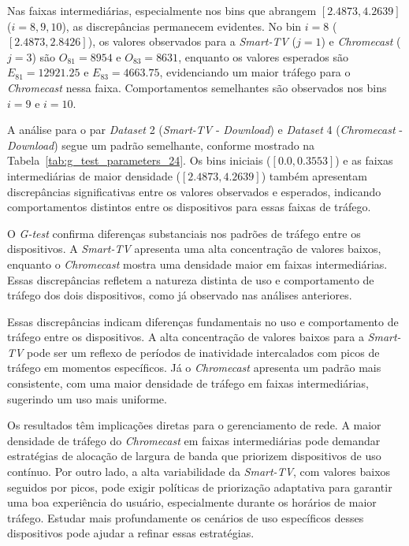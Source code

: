 Nas faixas intermediárias, especialmente nos bins que abrangem \([2.4873, 4.2639]\) (\(i = 8, 9, 10\)), as discrepâncias permanecem evidentes. No bin \(i=8\) (\([2.4873, 2.8426]\)), os valores observados para a \textit{Smart-TV} (\(j=1\)) e \textit{Chromecast} (\(j=3\)) são \(O_{81} = 8954\) e \(O_{83} = 8631\), enquanto os valores esperados são \(E_{81} = 12921.25\) e \(E_{83} = 4663.75\), evidenciando um maior tráfego para o \textit{Chromecast} nessa faixa. Comportamentos semelhantes são observados nos bins \(i=9\) e \(i=10\).

A análise para o par \textit{Dataset} 2 (\textit{Smart-TV} - \textit{Download}) e \textit{Dataset} 4 (\textit{Chromecast} - \textit{Download}) segue um padrão semelhante, conforme mostrado na Tabela~\ref{tab:g_test_parameters_24}. Os bins iniciais (\([0.0, 0.3553]\)) e as faixas intermediárias de maior densidade (\([2.4873, 4.2639]\)) também apresentam discrepâncias significativas entre os valores observados e esperados, indicando comportamentos distintos entre os dispositivos para essas faixas de tráfego.

O \textit{G-test} confirma diferenças substanciais nos padrões de tráfego entre os dispositivos. A \textit{Smart-TV} apresenta uma alta concentração de valores baixos, enquanto o \textit{Chromecast} mostra uma densidade maior em faixas intermediárias. Essas discrepâncias refletem a natureza distinta de uso e comportamento de tráfego dos dois dispositivos, como já observado nas análises anteriores.

Essas discrepâncias indicam diferenças fundamentais no uso e comportamento de tráfego entre os dispositivos. A alta concentração de valores baixos para a \textit{Smart-TV} pode ser um reflexo de períodos de inatividade intercalados com picos de tráfego em momentos específicos. Já o \textit{Chromecast} apresenta um padrão mais consistente, com uma maior densidade de tráfego em faixas intermediárias, sugerindo um uso mais uniforme.

Os resultados têm implicações diretas para o gerenciamento de rede. A maior densidade de tráfego do \textit{Chromecast} em faixas intermediárias pode demandar estratégias de alocação de largura de banda que priorizem dispositivos de uso contínuo. Por outro lado, a alta variabilidade da \textit{Smart-TV}, com valores baixos seguidos por picos, pode exigir políticas de priorização adaptativa para garantir uma boa experiência do usuário, especialmente durante os horários de maior tráfego. Estudar mais profundamente os cenários de uso específicos desses dispositivos pode ajudar a refinar essas estratégias.
